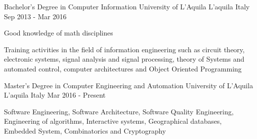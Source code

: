 


\begin{cventries}


\cventry
{Bachelor’s Degree in Computer Information} %
{University of L'Aquila} %
{L'aquila Italy} %
{Sep 2013 - Mar 2016} %
{ %
\begin{cvitems}
\item {Good knowledge of math disciplines}
\item {Training activities in the field of information engineering such as circuit theory, electronic systems, signal analysis and signal processing, theory of
	Systems and automated control, computer architectures and Object Oriented Programming}
\end{cvitems}
}
\cventry
{Master’s Degree in Computer Engineering and Automation} %
{University of L'Aquila} %
{L'aquila Italy} %
{Mar 2016 - Present} %
{ %
\begin{cvitems}
\item {Software Engineering, Software Architecture, Software Quality Engineering, Engineering of algorithms, 
	Interactive systems, Geographical databases, Embedded System, Combinatorics and Cryptography }
\end{cvitems}
}

\end{cventries}